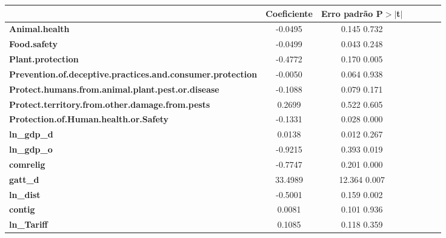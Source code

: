 \begin{center}
\begin{tabular}{lcccccc}
                                                                   & \textbf{Coeficiente} & \textbf{Erro padrão} \textbf{P$> |$t$|$}\\
\midrule
\textbf{Animal.health}                                             &      -0.0495  &        0.145             0.732\\
\textbf{Food.safety}                                               &      -0.0499  &        0.043             0.248\\
\textbf{Plant.protection}                                          &      -0.4772  &        0.170             0.005\\
\textbf{Prevention.of.deceptive.practices.and.consumer.protection} &      -0.0050  &        0.064             0.938\\
\textbf{Protect.humans.from.animal.plant.pest.or.disease}          &      -0.1088  &        0.079             0.171\\
\textbf{Protect.territory.from.other.damage.from.pests}            &       0.2699  &        0.522             0.605\\
\textbf{Protection.of.Human.health.or.Safety}                      &      -0.1331  &        0.028             0.000\\
\textbf{ln\_gdp\_d}                                                &       0.0138  &        0.012             0.267\\
\textbf{ln\_gdp\_o}                                                &      -0.9215  &        0.393             0.019\\
\textbf{comrelig}                                                  &      -0.7747  &        0.201             0.000\\
\textbf{gatt\_d}                                                   &      33.4989  &       12.364             0.007\\
\textbf{ln\_dist}                                                  &      -0.5001  &        0.159             0.002\\
\textbf{contig}                                                    &       0.0081  &        0.101             0.936\\
\textbf{ln\_Tariff}                                                &       0.1085  &        0.118             0.359\\
\bottomrule
\end{tabular}
\end{center}